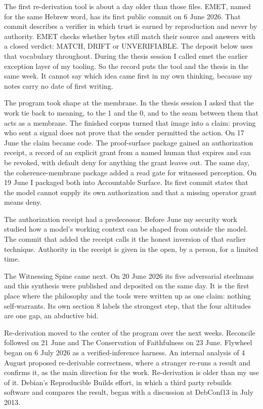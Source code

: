 \documentclass[11pt]{article}
\begin{document}
The first re-derivation tool is about a day older than those files. EMET, named for the same Hebrew word, has its first public commit on 6 June 2026. That commit describes a verifier in which trust is earned by reproduction and never by authority. EMET checks whether bytes still match their source and answers with a closed verdict: MATCH, DRIFT or UNVERIFIABLE. The deposit below uses that vocabulary throughout. During the thesis session I called emet the earlier exception layer of my tooling. So the record puts the tool and the thesis in the same week. It cannot say which idea came first in my own thinking, because my notes carry no date of first writing.

The program took shape at the membrane. In the thesis session I asked that the work tie back to meaning, to the 1 and the 0, and to the seam between them that acts as a membrane. The finished corpus turned that image into a claim: proving who sent a signal does not prove that the sender permitted the action. On 17 June the claim became code. The proof-surface package gained an authorization receipt, a record of an explicit grant from a named human that expires and can be revoked, with default deny for anything the grant leaves out. The same day, the coherence-membrane package added a read gate for witnessed perception. On 19 June I packaged both into Accountable Surface. Its first commit states that the model cannot supply its own authorization and that a missing operator grant means deny.

The authorization receipt had a predecessor. Before June my security work studied how a model's working context can be shaped from outside the model. The commit that added the receipt calls it the honest inversion of that earlier technique. Authority in the receipt is given in the open, by a person, for a limited time.

The Witnessing Spine came next. On 20 June 2026 its five adversarial steelmans and this synthesis were published and deposited on the same day. It is the first place where the philosophy and the tools were written up as one claim: nothing self-warrants. Its own section 8 labels the strongest step, that the four altitudes are one gap, an abductive bid.

Re-derivation moved to the center of the program over the next weeks. Reconcile followed on 21 June and The Conservation of Faithfulness on 23 June. Flywheel began on 6 July 2026 as a verified-inference harness. An internal analysis of 4 August proposed re-derivable correctness, where a stranger re-runs a result and confirms it, as the main direction for the work. Re-derivation is older than my use of it. Debian's Reproducible Builds effort, in which a third party rebuilds software and compares the result, began with a discussion at DebConf13 in July 2013.
\end{document}
